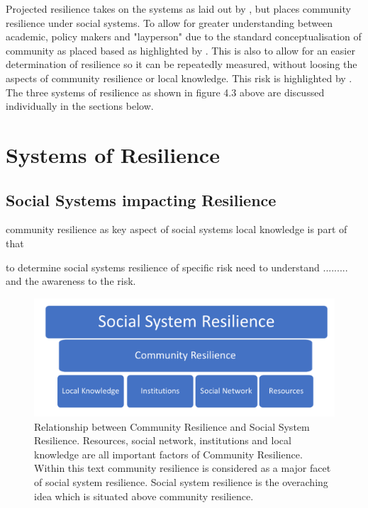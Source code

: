 Projected resilience takes on the systems as laid out by \cite{cutter_community_2020}, but places community resilience under social systems. To allow for greater understanding between academic, policy makers and "layperson" due to the standard conceptualisation of community as placed based as highlighted by \cite{rasanen_conceptualizing_2020}. This is also to allow for an easier determination of resilience so it can be repeatedly measured, without loosing the aspects of community resilience or local knowledge. This risk is highlighted by \cite{rasanen_conceptualizing_2020}. The three systems of resilience as shown in figure 4.3 above are discussed individually in the sections below.

\section{Systems of Resilience }

\subsection{Social Systems impacting Resilience}
community resilience as key aspect of social systems
local knowledge is part of that

to determine social systems resilience of specific risk need to understand ......... and the awareness to the risk. 

\begin{figure}[h]
    \centering
    \includegraphics[width=1\textwidth]{fig_theory/social system hierarchy.png}
    \caption{Relationship between Community Resilience and Social System Resilience. Resources, social network, institutions and local knowledge are all important factors of Community Resilience. Within this text community resilience is considered as a major facet of social system resilience. Social system resilience is the overaching idea which is situated above community resilience.}
    \label{fig:social_resilience}
\end{figure}
